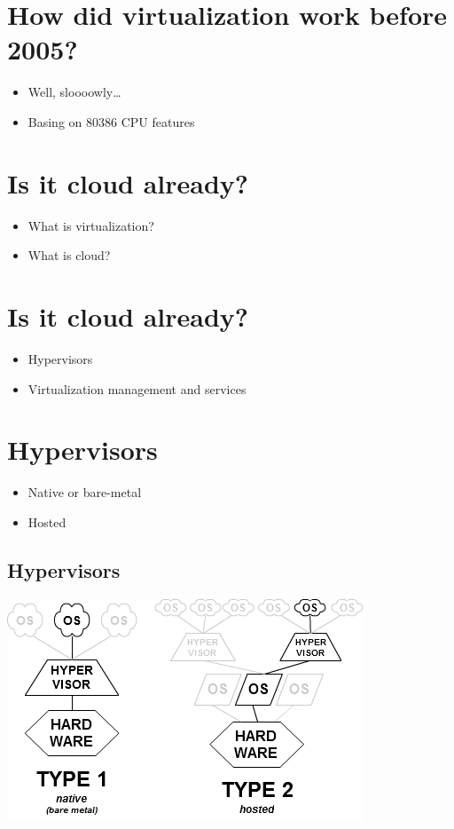 \documentclass[11pt]{article}
\begin{document}
\section*{How did virtualization work before 2005?}
\label{sec:orgf8e6a59}
\begin{itemize}
\item Well, sloooowly\ldots{}
\item Basing on 80386 CPU features
\end{itemize}

\section*{Is it cloud already?}
\label{sec:org25e29ea}
\begin{itemize}
\item What is virtualization?
\item What is cloud?
\end{itemize}

\section*{Is it cloud already?}
\label{sec:org3dce481}
\begin{itemize}
\item Hypervisors
\item Virtualization management and services
\end{itemize}

\section*{Hypervisors}
\label{sec:orgb42cbe7}
\begin{itemize}
\item Native or bare-metal
\item Hosted
\end{itemize}

\subsection*{Hypervisors}
\label{sec:org21c2943}
\begin{center}
\includegraphics[width=.9\linewidth]{./hyperviseur.png}
\end{center}
\end{document}
